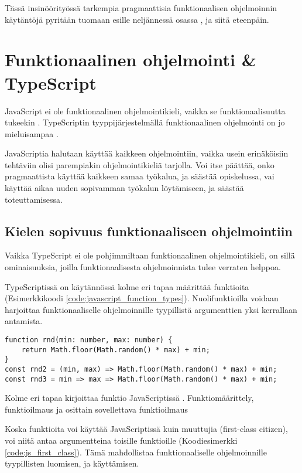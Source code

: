 Tässä insinöörityössä tarkempia pragmaattisia funktionaalisen ohjelmoinnin käytäntöjä pyritään tuomaan esille neljännessä osassa , ja siitä eteenpäin.

\section{Funktionaalinen ohjelmointi \& TypeScript}
JavaScript ei ole funktionaalinen ohjelmointikieli, vaikka se funktionaalisuutta tukeekin \cite{is_reduce_bad}. TypeScriptin tyyppijärjestelmällä funktionaalinen ohjelmointi on jo mieluisampaa \cite{holvikari2021category}.

JavaScriptia halutaan käyttää kaikkeen ohjelmointiin, vaikka usein erinäköisiin tehtäviin olisi parempiakin ohjelmointikieliä tarjolla. Voi itse päättää, onko pragmaattista käyttää kaikkeen samaa työkalua, ja säästää opiskelussa, vai käyttää aikaa uuden sopivamman työkalun löytämiseen, ja säästää toteuttamisessa.


\subsection{Kielen sopivuus funktionaaliseen ohjelmointiin}

Vaikka TypeScript ei ole pohjimmiltaan funktionaalinen ohjelmointikieli, on sillä ominaisuuksia, joilla funktionaalisesta ohjelmoinnista tulee verraten helppoa.

TypeScriptissä on käytännössä kolme eri tapaa määrittää funktioita (Esimerkkikoodi \ref{code:javascript_function_types}). Nuolifunktioilla voidaan harjoittaa funktionaaliselle ohjelmoinnille tyypillistä argumenttien yksi kerrallaan antamista.


\begin{code}
    \begin{verbatim}
function rnd(min: number, max: number) { 
	return Math.floor(Math.random() * max) + min;
}
const rnd2 = (min, max) => Math.floor(Math.random() * max) + min;
const rnd3 = min => max => Math.floor(Math.random() * max) + min;
\end{verbatim}
    \caption{Kolme eri tapaa kirjoittaa funktio JavaScriptissä \cite{okhravi-g-discussion}. Funktiomäärittely, funktioilmaus ja osittain sovellettava funktioilmaus}
    \label{code:javascript_function_types}
\end{code}

Koska funktioita voi käyttää JavaScriptissä kuin muuttujia (first-class citizen), voi niitä antaa argumentteina toisille funktioille (Koodiesimerkki \ref{code:js_first_class}). Tämä mahdollistaa funktionaaliselle ohjelmoinnille tyypillisten  luomisen, ja käyttämisen.

